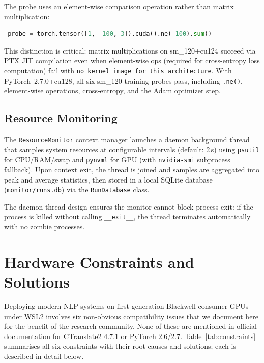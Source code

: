 \documentclass[conference]{IEEEtran}
\begin{document}
The probe uses an element-wise comparison operation rather than matrix multiplication:

\begin{lstlisting}[language=Python, caption={Training CUDA probe (not matmul).}]
_probe = torch.tensor([1, -100, 3]).cuda().ne(-100).sum()
\end{lstlisting}

This distinction is critical: matrix multiplications on sm\_120+cu124 succeed via
PTX JIT compilation even when element-wise ops (required for cross-entropy loss
computation) fail with \texttt{no kernel image for this architecture}.
With PyTorch~2.7.0+cu128, all six sm\_120 training probes pass, including
\texttt{.ne()}, element-wise operations, cross-entropy, and the Adam optimizer step.

\subsection{Resource Monitoring}

The \texttt{ResourceMonitor} context manager launches a daemon background thread that
samples system resources at configurable intervals (default: 2\,s) using \texttt{psutil}
for CPU/RAM/swap and \texttt{pynvml} for GPU (with \texttt{nvidia-smi} subprocess
fallback). Upon context exit, the thread is joined and samples are aggregated into
peak and average statistics, then stored in a local SQLite database
(\texttt{monitor/runs.db}) via the \texttt{RunDatabase} class.

The daemon thread design ensures the monitor cannot block process exit: if the process
is killed without calling \texttt{\_\_exit\_\_}, the thread terminates automatically
with no zombie processes.

\section{Hardware Constraints and Solutions}
\label{sec:constraints}

Deploying modern NLP systems on first-generation Blackwell consumer GPUs under
WSL2 involves six non-obvious compatibility issues that we document here for
the benefit of the research community. None of these are mentioned in official
documentation for CTranslate2 4.7.1 or PyTorch 2.6/2.7.
Table~\ref{tab:constraints} summarises all six constraints with their root causes
and solutions; each is described in detail below.
\end{document}
